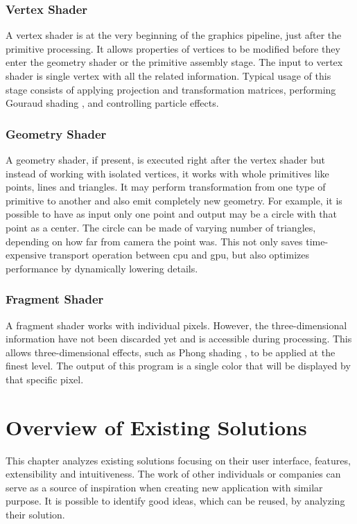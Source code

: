 \subsection{Vertex Shader}
A vertex shader is at the very beginning of the graphics pipeline, just after the primitive processing. It allows properties of vertices to be modified before they enter the geometry shader or the primitive assembly stage. The input to vertex shader is
single vertex with all the related information. Typical usage of this stage consists
of applying projection and transformation matrices, performing Gouraud shading \cite{goraud}, and controlling particle effects.

\subsection{Geometry Shader}
A geometry shader, if present, is executed right after the vertex shader but instead
of working with isolated vertices, it works with whole primitives like points,
lines and triangles. It may perform transformation from one type of primitive to
another and also emit completely new geometry. For example, it is possible to
have as input only one point and output may be a circle with that point as a
center. The circle can be made of varying number of triangles, depending on how far from camera
the point was. This not only saves time-expensive transport operation between
\gls{cpu} and \gls{gpu}, but also optimizes performance by dynamically lowering details.

\subsection{Fragment Shader}
A fragment shader works with individual pixels. However, the three-dimensional information have
not been discarded yet and is accessible during processing. This allows
three-dimensional effects, such as Phong shading \cite{phong}, to be applied at the finest level. The output
of this program is a single color that will be displayed by that specific pixel.

\chapter{Overview of Existing Solutions}
\label{existSol}
This chapter analyzes existing solutions focusing on their user interface, features, extensibility and intuitiveness. The work of other individuals or companies can serve as a source of inspiration when creating new application with similar purpose. It is possible to identify good ideas, which can be reused, by analyzing their solution.  

